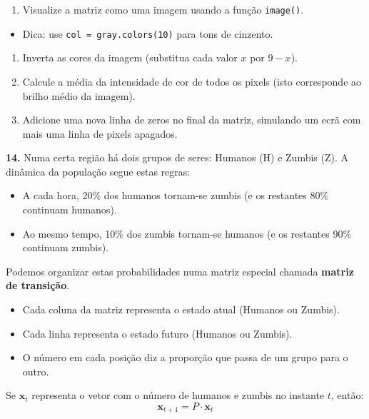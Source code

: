 \documentclass[
]{book}
\providecommand{\tightlist}{%
  \setlength{\itemsep}{0pt}\setlength{\parskip}{0pt}}
\begin{document}
\begin{enumerate}
\def\labelenumi{(\alph{enumi})}
\setcounter{enumi}{1}
\tightlist
\item
  Visualize a matriz como uma imagem usando a função \texttt{image()}.\\
\end{enumerate}

\begin{itemize}
\tightlist
\item
  Dica: use \texttt{col\ =\ gray.colors(10)} para tons de cinzento.
\end{itemize}

\begin{enumerate}
\def\labelenumi{(\alph{enumi})}
\setcounter{enumi}{2}
\item
  Inverta as cores da imagem (substitua cada valor \(x\) por \(9 - x\)).
\item
  Calcule a média da intensidade de cor de todos os pixels (isto corresponde ao brilho médio da imagem).
\item
  Adicione uma nova linha de zeros no final da matriz, simulando um ecrã com mais uma linha de pixels apagados.
\end{enumerate}

\textbf{14.} Numa certa região há dois grupos de seres: Humanos (H) e Zumbis (Z). A dinâmica da população segue estas regras:

\begin{itemize}
\tightlist
\item
  A cada hora, 20\% dos humanos tornam-se zumbis (e os restantes 80\% continuam humanos).
\item
  Ao mesmo tempo, 10\% dos zumbis tornam-se humanos (e os restantes 90\% continuam zumbis).
\end{itemize}

Podemos organizar estas probabilidades numa matriz especial chamada \textbf{matriz de transição}.

\begin{itemize}
\tightlist
\item
  Cada coluna da matriz representa o estado atual (Humanos ou Zumbis).
\item
  Cada linha representa o estado futuro (Humanos ou Zumbis).
\item
  O número em cada posição diz a proporção que passa de um grupo para o outro.
\end{itemize}

Se \(\mathbf{x}_t\) representa o vetor com o número de humanos e zumbis no instante \(t\), então: \[\mathbf{x}_{t+1} = P \cdot \mathbf{x}_t\]
\end{document}
